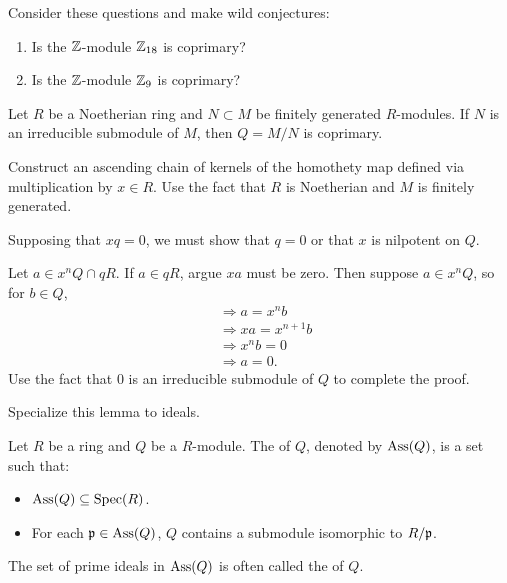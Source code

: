 \documentclass{ximera}
\begin{document}
\begin{exercise}
  Consider these questions and make wild conjectures:
  \begin{enumerate}
  \item Is the $\mathbb Z$-module $\mathbb Z_{18}$ is coprimary?
  \item Is the $\mathbb Z$-module $\mathbb Z_{9}$ is coprimary?
  \end{enumerate}
\end{exercise}


\begin{lemma}\label{L:irrcoprimary}
  Let $R$ be a Noetherian ring and $N\subset M$ be finitely generated
  $R$-modules. If $N$ is an irreducible submodule of $M$, then $Q=M/N$
  is coprimary.
  \begin{sketch}
    Construct an ascending chain of kernels of the homothety map
    defined via multiplication by $x\in R$. Use the fact that $R$ is
    Noetherian and $M$ is finitely generated.
    
    Supposing that $x q= 0$, we must show that $q= 0$ or that $x$ is
    nilpotent on $Q$.

    Let $a \in x^n Q \cap qR$. If $a\in qR$, argue $xa$ must be zero.
    Then suppose $a\in x^n Q$, so for $b\in Q$,
    \begin{align*}
      &\Rightarrow a = x^nb\\
      &\Rightarrow xa = x^{n+1}b\\
      &\Rightarrow x^n b = 0\\
      &\Rightarrow a=0.
    \end{align*}
    Use the fact that $0$ is an irreducible submodule of $Q$ to
    complete the proof.
  \end{sketch}
\end{lemma}


\begin{exercise}
  Specialize this lemma to ideals.
\end{exercise}



\begin{definition}
  Let $R$ be a ring and $Q$ be a $R$-module. The  of
  $Q$, denoted by $\operatorname{Ass}(Q)$, is a set such that:
  \begin{itemize}
  \item $\operatorname{Ass}(Q)\subseteq\operatorname{Spec}(R)$.
  \item For each $\mathfrak{p}\in\operatorname{Ass}(Q)$, $Q$ contains a submodule isomorphic
    to $R/\mathfrak{p}$.
  \end{itemize}
  The set of prime ideals in $\operatorname{Ass}(Q)$ is often called the
   of $Q$.
\end{definition}
\end{document}
